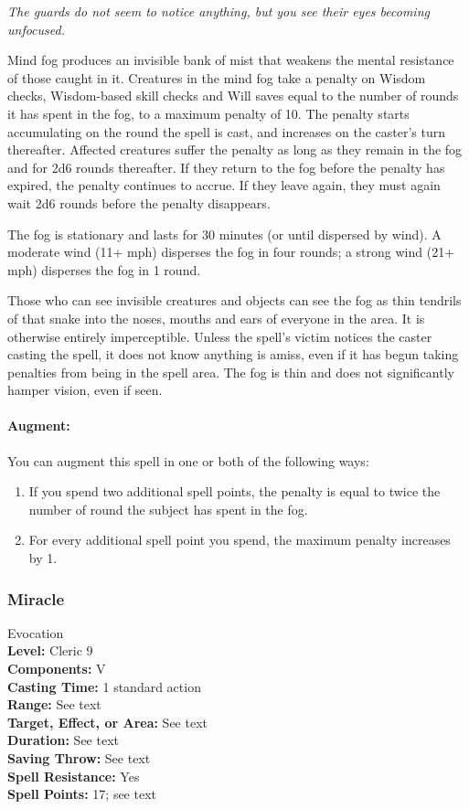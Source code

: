 \emph{The guards do not seem to notice anything, but you see their eyes becoming unfocused.}

Mind fog produces an invisible bank of mist that weakens the mental resistance of those caught in it. 
Creatures in the mind fog take a penalty on Wisdom checks, 
Wisdom-based skill checks and Will saves equal to the number of rounds it has spent in the fog, 
to a maximum penalty of 10.
The penalty starts accumulating on the round the spell is cast, and increases on the caster's turn thereafter.
Affected creatures suffer the penalty as long as they remain in the fog and for 2d6 rounds thereafter.
If they return to the fog before the penalty has expired, the penalty continues to accrue. 
If they leave again, they must again wait 2d6 rounds before the penalty disappears.

The fog is stationary and lasts for 30 minutes (or until dispersed by wind).
A moderate wind (11+ mph) disperses the fog in four rounds; a strong wind (21+ mph) disperses the fog in 1 round.

Those who can see invisible creatures and objects can see the fog as thin tendrils of that snake into the noses, mouths and ears of everyone in the area.
It is otherwise entirely imperceptible. 
Unless the spell's victim notices the caster casting the spell, it does not know anything is amiss, even if it has begun taking penalties from being in the spell area.
The fog is thin and does not significantly hamper vision, even if seen.

\paragraph{Augment:} You can augment this spell in one or both of the following ways:
\begin{enumerate}
 \item If you spend two additional spell points, the penalty is equal to twice the number of round the subject has spent in the fog.
 \item For every additional spell point you spend, the maximum penalty increases by 1.
\end{enumerate}
\subsubsection{Miracle}
\label{Spell:Miracle}
Evocation
\\ \textbf{Level:} Cleric 9
\\ \textbf{Components:} V
\\ \textbf{Casting Time:} 1 standard action
\\ \textbf{Range:} See text
\\ \textbf{Target, Effect, or Area:} See text
\\ \textbf{Duration:} See text
\\ \textbf{Saving Throw:} See text
\\ \textbf{Spell Resistance:} Yes
\\ \textbf{Spell Points:} 17; see text

